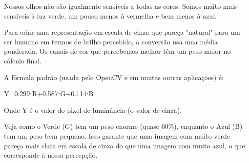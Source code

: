 \documentclass[12pt, a4paper]{article}
\begin{document}
Nossos olhos não são igualmente sensíveis a todas as cores. Somos muito mais sensíveis à luz verde, um pouco menos à vermelha e bem menos à azul.

Para criar uma representação em escala de cinza que pareça "natural" para um ser humano em termos de brilho percebido, a conversão usa uma média ponderada. Os canais de cor que percebemos melhor têm um peso maior no cálculo final.

A fórmula padrão (usada pelo OpenCV e em muitas outras aplicações) é:

Y=0.299⋅R+0.587⋅G+0.114⋅B

Onde Y é o valor do pixel de luminância (o valor de cinza).

Veja como o Verde (G) tem um peso enorme (quase $60\%$), enquanto o Azul (B) tem um peso bem pequeno. Isso garante que uma imagem com muito verde pareça mais clara em escala de cinza do que uma imagem com muito azul, o que corresponde à nossa percepção.



\end{document}

